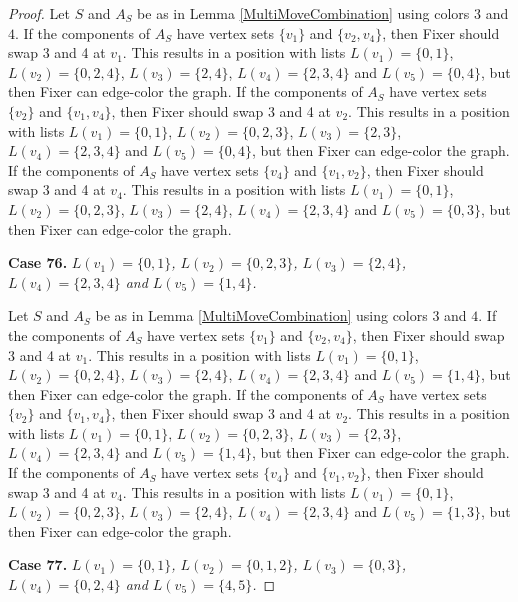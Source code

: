 \documentclass[12pt]{amsart}
\theoremstyle{plain}
\theoremstyle{definition}
\theoremstyle{remark}
\begin{document}
\begin{proof}
Let $S$ and $A_S$ be as in Lemma \ref{MultiMoveCombination} using colors $3$ and $4$. If the components of $A_S$ have vertex sets $\{v_1\}$ and $\{v_2, v_4\}$, then Fixer should swap 3 and 4 at $v_1$. This results in a position with lists $L(v_1) = \{0, 1\}$, $L(v_2) = \{0, 2, 4\}$, $L(v_3) = \{2, 4\}$, $L(v_4) = \{2, 3, 4\}$ and $L(v_5) = \{0, 4\}$, but then Fixer can edge-color the graph.
If the components of $A_S$ have vertex sets $\{v_2\}$ and $\{v_1, v_4\}$, then Fixer should swap 3 and 4 at $v_2$. This results in a position with lists $L(v_1) = \{0, 1\}$, $L(v_2) = \{0, 2, 3\}$, $L(v_3) = \{2, 3\}$, $L(v_4) = \{2, 3, 4\}$ and $L(v_5) = \{0, 4\}$, but then Fixer can edge-color the graph.
If the components of $A_S$ have vertex sets $\{v_4\}$ and $\{v_1, v_2\}$, then Fixer should swap 3 and 4 at $v_4$. This results in a position with lists $L(v_1) = \{0, 1\}$, $L(v_2) = \{0, 2, 3\}$, $L(v_3) = \{2, 4\}$, $L(v_4) = \{2, 3, 4\}$ and $L(v_5) = \{0, 3\}$, but then Fixer can edge-color the graph.

\noindent\textbf{Case 76.  }\textit{$L(v_1) = \{0, 1\}$, $L(v_2) = \{0, 2, 3\}$, $L(v_3) = \{2, 4\}$, $L(v_4) = \{2, 3, 4\}$ and $L(v_5) = \{1, 4\}$.}

Let $S$ and $A_S$ be as in Lemma \ref{MultiMoveCombination} using colors $3$ and $4$. If the components of $A_S$ have vertex sets $\{v_1\}$ and $\{v_2, v_4\}$, then Fixer should swap 3 and 4 at $v_1$. This results in a position with lists $L(v_1) = \{0, 1\}$, $L(v_2) = \{0, 2, 4\}$, $L(v_3) = \{2, 4\}$, $L(v_4) = \{2, 3, 4\}$ and $L(v_5) = \{1, 4\}$, but then Fixer can edge-color the graph.
If the components of $A_S$ have vertex sets $\{v_2\}$ and $\{v_1, v_4\}$, then Fixer should swap 3 and 4 at $v_2$. This results in a position with lists $L(v_1) = \{0, 1\}$, $L(v_2) = \{0, 2, 3\}$, $L(v_3) = \{2, 3\}$, $L(v_4) = \{2, 3, 4\}$ and $L(v_5) = \{1, 4\}$, but then Fixer can edge-color the graph.
If the components of $A_S$ have vertex sets $\{v_4\}$ and $\{v_1, v_2\}$, then Fixer should swap 3 and 4 at $v_4$. This results in a position with lists $L(v_1) = \{0, 1\}$, $L(v_2) = \{0, 2, 3\}$, $L(v_3) = \{2, 4\}$, $L(v_4) = \{2, 3, 4\}$ and $L(v_5) = \{1, 3\}$, but then Fixer can edge-color the graph.

\noindent\textbf{Case 77.  }\textit{$L(v_1) = \{0, 1\}$, $L(v_2) = \{0, 1, 2\}$, $L(v_3) = \{0, 3\}$, $L(v_4) = \{0, 2, 4\}$ and $L(v_5) = \{4, 5\}$.}


\end{proof}
\end{document}
